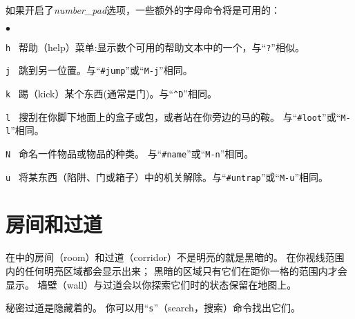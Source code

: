\documentclass[a4paper, 10pt]{article}
\newcommand{\nd}{\noindent}
\newcommand{\tb}[1]{\tt #1 \hfill}
\newcommand{\blist}[1]
{\begin{list}{$\bullet$}
    {\leftmargin 30mm \topsep 2mm \partopsep 0mm \parsep 0mm \itemsep 1mm
     \labelwidth 28mm \labelsep 2mm
     #1}}
\newcommand{\elist}{\end{list}}
\begin{document}
\nd 如果开启了{\it number\_pad\/}选项，一些额外的字母命令将是可用的：
\blist{}
\item[\tb{h}]
帮助（help）菜单:显示数个可用的帮助文本中的一个，与“{\tt ?}”相似。
\item[\tb{j}]
跳到另一位置。与“{\tt \#jump}”或“{\tt M-j}”相同。
\item[\tb{k}]
踢（kick）某个东西(通常是门)。与“{\tt \^{}D}”相同。
\item[\tb{l}]
搜刮在你脚下地面上的盒子或包，或者站在你旁边的马的鞍。
与“{\tt \#loot}”或“{\tt M-l}”相同。
\item[\tb{N}]
命名一件物品或物品的种类。
与“{\tt \#name}”或“{\tt M-n}”相同。
\item[\tb{u}]
将某东西（陷阱、门或箱子）中的机关解除。与“{\tt \#untrap}”或“{\tt M-u}”相同。
\elist

\section{房间和过道}

在\zhTransDungeon{}中的房间（room）和过道（corridor）不是明亮的就是黑暗的。
在你视线范围内的任何明亮区域都会显示出来；
黑暗的区域只有它们在距你一格的范围内才会显示。
墙壁（wall）与过道会以你探索它们时的状态保留在地图上。

秘密过道是隐藏着的。
你可以用“{\tt s}”（search，搜索）命令找出它们。
\end{document}

